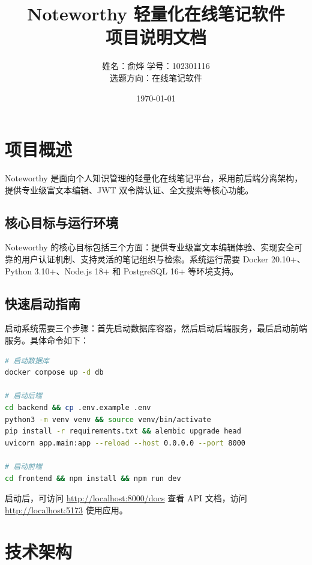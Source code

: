 \documentclass[12pt,a4paper]{article}
\title{\textbf{Noteworthy}  轻量化在线笔记软件\\项目说明文档}
\author{姓名：俞烨 \quad 学号：102301116\\选题方向：在线笔记软件}
\date{\today}
\begin{document}
\maketitle
\thispagestyle{empty}
\tableofcontents
\pagebreak

\section{项目概述}

Noteworthy 是面向个人知识管理的轻量化在线笔记平台，采用前后端分离架构，提供专业级富文本编辑、JWT 双令牌认证、全文搜索等核心功能。

\subsection{核心目标与运行环境}

Noteworthy 的核心目标包括三个方面：提供专业级富文本编辑体验、实现安全可靠的用户认证机制、支持灵活的笔记组织与检索。系统运行需要 Docker 20.10+、Python 3.10+、Node.js 18+ 和 PostgreSQL 16+ 等环境支持。

\subsection{快速启动指南}

启动系统需要三个步骤：首先启动数据库容器，然后启动后端服务，最后启动前端服务。具体命令如下：

\begin{lstlisting}[language=bash]
# 启动数据库
docker compose up -d db

# 启动后端
cd backend && cp .env.example .env
python3 -m venv venv && source venv/bin/activate
pip install -r requirements.txt && alembic upgrade head
uvicorn app.main:app --reload --host 0.0.0.0 --port 8000

# 启动前端
cd frontend && npm install && npm run dev
\end{lstlisting}

启动后，可访问 \url{http://localhost:8000/docs} 查看 API 文档，访问 \url{http://localhost:5173} 使用应用。

\section{技术架构}
\end{document}
